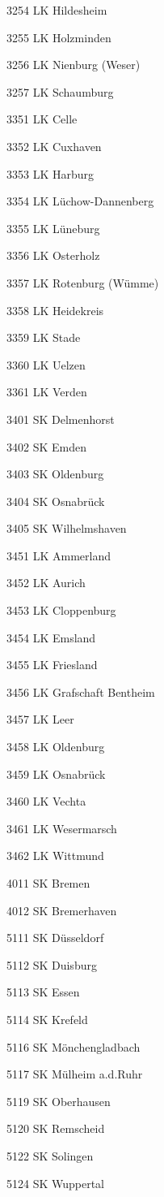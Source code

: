3254  LK Hildesheim

3255  LK Holzminden

3256  LK Nienburg (Weser)

3257  LK Schaumburg

3351  LK Celle

3352  LK Cuxhaven

3353  LK Harburg

3354  LK Lüchow-Dannenberg

3355  LK Lüneburg

3356  LK Osterholz

3357  LK Rotenburg (Wümme)

3358  LK Heidekreis

3359  LK Stade

3360  LK Uelzen

3361  LK Verden

3401  SK Delmenhorst

3402  SK Emden

3403  SK Oldenburg

3404  SK Osnabrück

3405  SK Wilhelmshaven

3451  LK Ammerland

3452  LK Aurich

3453  LK Cloppenburg

3454  LK Emsland

3455  LK Friesland

3456  LK Grafschaft Bentheim

3457  LK Leer

3458  LK Oldenburg

3459  LK Osnabrück

3460  LK Vechta

3461  LK Wesermarsch

3462  LK Wittmund

4011  SK Bremen

4012  SK Bremerhaven

5111  SK Düsseldorf

5112  SK Duisburg

5113  SK Essen

5114  SK Krefeld

5116  SK Mönchengladbach

5117  SK Mülheim a.d.Ruhr

5119  SK Oberhausen

5120  SK Remscheid

5122  SK Solingen

5124  SK Wuppertal

